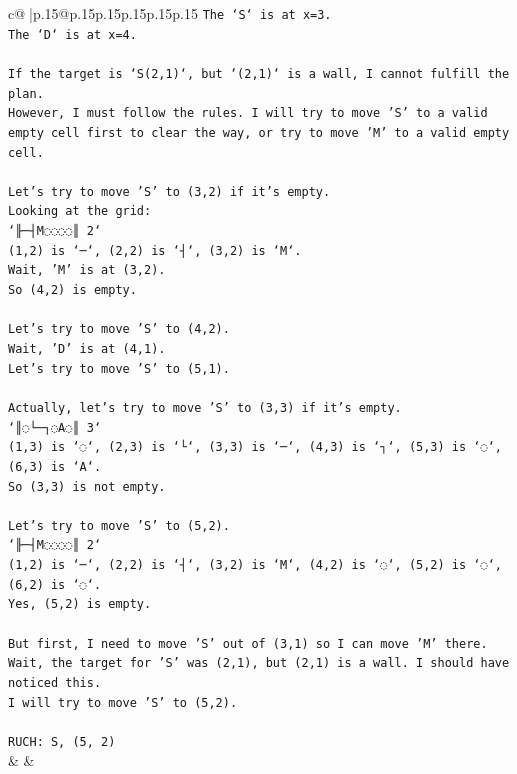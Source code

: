 \documentclass{article}
\begin{document}
{\begin{supertabular}{c@{$\;$}|p{.15\linewidth}@{}p{.15\linewidth}p{.15\linewidth}p{.15\linewidth}p{.15\linewidth}p{.15\linewidth}}
{{{\texttt{The `S` is at x=3.} \\
\texttt{The `D` is at x=4.} \\
\\ 
\texttt{If the target is `S(2,1)`, but `(2,1)` is a wall, I cannot fulfill the plan.} \\
\texttt{However, I must follow the rules. I will try to move 'S' to a valid empty cell first to clear the way, or try to move 'M' to a valid empty cell.} \\
\\ 
\texttt{Let's try to move 'S' to (3,2) if it's empty.} \\
\texttt{Looking at the grid:} \\
\texttt{`╟─┤M◌◌◌◌║ 2`} \\
\texttt{(1,2) is `─`, (2,2) is `┤`, (3,2) is `M`.} \\
\texttt{Wait, 'M' is at (3,2).} \\
\texttt{So (4,2) is empty.} \\
\\ 
\texttt{Let's try to move 'S' to (4,2).} \\
\texttt{Wait, 'D' is at (4,1).} \\
\texttt{Let's try to move 'S' to (5,1).} \\
\\ 
\texttt{Actually, let's try to move 'S' to (3,3) if it's empty.} \\
\texttt{`║◌└─┐◌A◌║ 3`} \\
\texttt{(1,3) is `◌`, (2,3) is `└`, (3,3) is `─`, (4,3) is `┐`, (5,3) is `◌`, (6,3) is `A`.} \\
\texttt{So (3,3) is not empty.} \\
\\ 
\texttt{Let's try to move 'S' to (5,2).} \\
\texttt{`╟─┤M◌◌◌◌║ 2`} \\
\texttt{(1,2) is `─`, (2,2) is `┤`, (3,2) is `M`, (4,2) is `◌`, (5,2) is `◌`, (6,2) is `◌`.} \\
\texttt{Yes, (5,2) is empty.} \\
\\ 
\texttt{But first, I need to move 'S' out of (3,1) so I can move 'M' there.} \\
\texttt{Wait, the target for 'S' was (2,1), but (2,1) is a wall. I should have noticed this.} \\
\texttt{I will try to move 'S' to (5,2).} \\
\\ 
\texttt{RUCH: S, (5, 2)} \\
            }
        }
    }
    & & \\ \\


\end{supertabular}}
\end{document}
